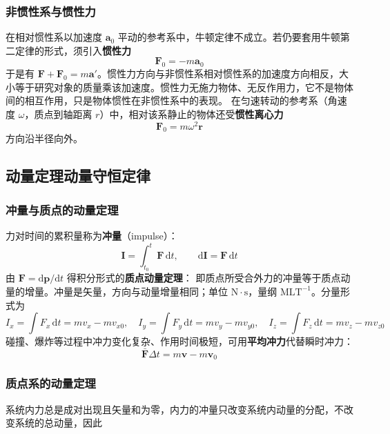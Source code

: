         \subsubsection{非惯性系与惯性力}
        在相对惯性系以加速度 $\boldsymbol{a}_{0}$ 平动的参考系中，牛顿定律不成立。若仍要套用牛顿第二定律的形式，须引入\textbf{惯性力}
        \[
        \boldsymbol{F}_{0}=-m\boldsymbol{a}_{0}
        \]
        于是有 $\boldsymbol{F}+\boldsymbol{F}_{0}=m\boldsymbol{a}'$。惯性力方向与非惯性系相对惯性系的加速度方向相反，大小等于研究对象的质量乘该加速度。惯性力无施力物体、无反作用力，它不是物体间的相互作用，只是物体惯性在非惯性系中的表现。
        在匀速转动的参考系（角速度 $\omega$，质点到轴距离 $r$）中，相对该系静止的物体还受\textbf{惯性离心力}
        \[
        \boldsymbol{F}_{0}=m\omega^{2}\boldsymbol{r}
        \]
        方向沿半径向外。

    \subsection{动量定理\texorpdfstring{\hspace{0.5em}}{ }动量守恒定律}
        \subsubsection{冲量与质点的动量定理}
        力对时间的累积量称为\textbf{冲量}（impulse）：
        \[
        \boldsymbol{I}=\int_{t_{0}}^{t}\boldsymbol{F}\,\mathrm{d}t,\qquad \mathrm{d}\boldsymbol{I}=\boldsymbol{F}\,\mathrm{d}t
        \]
        由 $\boldsymbol{F}=\mathrm{d}\boldsymbol{p}/\mathrm{d}t$ 得积分形式的\textbf{质点动量定理}：
        即质点所受合外力的冲量等于质点动量的增量。冲量是矢量，方向与动量增量相同；单位 $\mathrm{N\cdot s}$，量纲 $\mathrm{MLT^{-1}}$。分量形式为
        \[
        I_{x}=\int F_{x}\,\mathrm{d}t=mv_{x}-mv_{x0},\quad
        I_{y}=\int F_{y}\,\mathrm{d}t=mv_{y}-mv_{y0},\quad
        I_{z}=\int F_{z}\,\mathrm{d}t=mv_{z}-mv_{z0}
        \]
        碰撞、爆炸等过程中冲力变化复杂、作用时间极短，可用\textbf{平均冲力}代替瞬时冲力：
        \[
        \bar{\boldsymbol{F}}\Delta t=m\boldsymbol{v}-m\boldsymbol{v}_{0}
        \]

        \subsubsection{质点系的动量定理}
        系统内力总是成对出现且矢量和为零，内力的冲量只改变系统内动量的分配，不改变系统的总动量，因此

